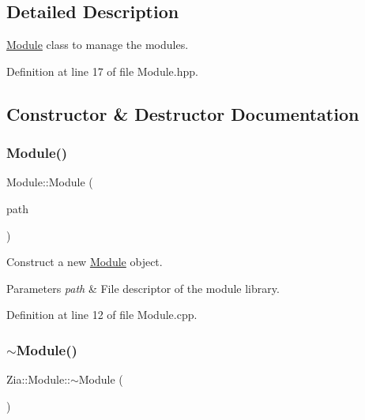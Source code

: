 \subsection{Detailed Description}
\hyperlink{class_zia_1_1_module}{Module} class to manage the modules. 

Definition at line 17 of file Module.\+hpp.



\subsection{Constructor \& Destructor Documentation}
\mbox{\label{class_zia_1_1_module_a4e5330e20703c939d940afe737bd4d1b}} 
\subsubsection{\texorpdfstring{Module()}{Module()}}
{\footnotesize\ttfamily Module\+::\+Module (\begin{DoxyParamCaption}\item[{const \hyperlink{namespacecfg_af0aed6e47bd26e91ad7d69467f96caaf}{cfg\+::\+File\+Descriptor} \&}]{path }\end{DoxyParamCaption})}



Construct a new \hyperlink{class_zia_1_1_module}{Module} object. 


\begin{DoxyParams}{Parameters}
{\em path} & File descriptor of the module library. \\
\hline
\end{DoxyParams}


Definition at line 12 of file Module.\+cpp.

\mbox{\label{class_zia_1_1_module_a91f712e682b2b949656b90796879d8b1}} 
\subsubsection{\texorpdfstring{$\sim$\+Module()}{~Module()}}
{\footnotesize\ttfamily Zia\+::\+Module\+::$\sim$\+Module (\begin{DoxyParamCaption}{ }\end{DoxyParamCaption})\hspace{0.3cm}{\ttfamily [default]}}



